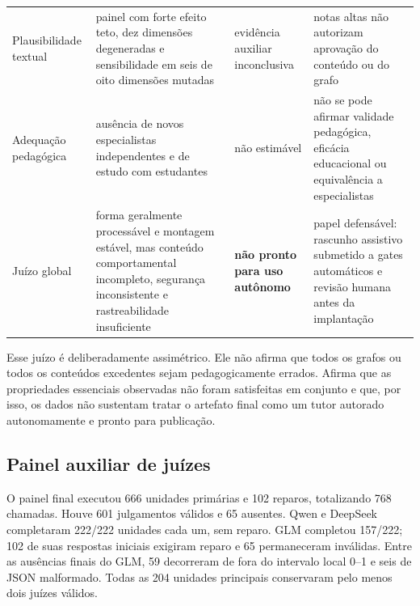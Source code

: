 \documentclass[11pt,a4paper]{article}
\begin{document}
\begin{longtable}{@{}P{2.65cm}P{4.55cm}P{3.15cm}P{4.15cm}@{}}
Plausibilidade textual & painel com forte efeito teto, dez dimensões degeneradas e sensibilidade em seis de oito dimensões mutadas & evidência auxiliar inconclusiva & notas altas não autorizam aprovação do conteúdo ou do grafo \\
Adequação pedagógica & ausência de novos especialistas independentes e de estudo com estudantes & não estimável & não se pode afirmar validade pedagógica, eficácia educacional ou equivalência a especialistas \\
\midrule
Juízo global & forma geralmente processável e montagem estável, mas conteúdo comportamental incompleto, segurança inconsistente e rastreabilidade insuficiente & \textbf{não pronto para uso autônomo} & papel defensável: rascunho assistivo submetido a gates automáticos e revisão humana antes da implantação \\
\bottomrule
\end{longtable}
\endgroup

Esse juízo é deliberadamente assimétrico. Ele não afirma que todos os grafos ou todos os conteúdos excedentes sejam pedagogicamente errados. Afirma que as propriedades essenciais observadas não foram satisfeitas em conjunto e que, por isso, os dados não sustentam tratar o artefato final como um tutor autorado autonomamente e pronto para publicação.

\subsection{Painel auxiliar de juízes}

O painel final executou 666 unidades primárias e 102 reparos, totalizando 768 chamadas. Houve 601 julgamentos válidos e 65 ausentes. Qwen e DeepSeek completaram 222/222 unidades cada um, sem reparo. GLM completou 157/222; 102 de suas respostas iniciais exigiram reparo e 65 permaneceram inválidas. Entre as ausências finais do GLM, 59 decorreram de  fora do intervalo local 0--1 e seis de JSON malformado. Todas as 204 unidades principais conservaram pelo menos dois juízes válidos.
\end{document}
